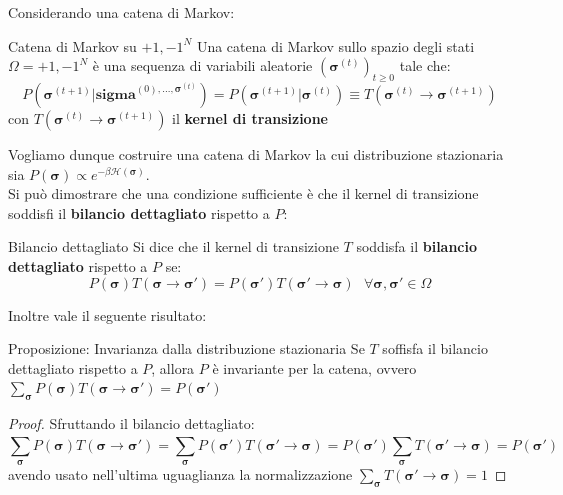 Considerando una catena di Markov:
\begin{boxb}{Catena di Markov su ${+1,-1}^N$}
Una catena di Markov sullo spazio degli stati $\Omega={+1,-1}^N$ è una sequenza di variabili aleatorie $(\mathbf{\sigma}^{(t)})_{t \ge 0}$ tale che:
\begin{equation}
    P(\mathbf{\sigma}^{(t+1)}| \mathbf{sigma}^{(0),..., \mathbf{\sigma}^{(t)}})=P(\mathbf{\sigma}^{(t+1)}| \mathbf{\sigma}^{(t)})\equiv T(\mathbf{\sigma}^{(t)}\to \mathbf{\sigma}^{(t+1)})
\end{equation}
con $T(\mathbf{\sigma}^{(t)}\to \mathbf{\sigma}^{(t+1)})$ il \textbf{kernel di transizione}
\end{boxb}
Vogliamo dunque costruire una catena di Markov la cui distribuzione stazionaria sia $P(\mathbf{\sigma}) \propto e^{-\beta \mathcal{H(\mathbf{\sigma})}}$. \\
Si può dimostrare che una condizione sufficiente è che il kernel di transizione soddisfi il \textbf{bilancio dettagliato} rispetto a $P$:
\begin{boxb}{Bilancio dettagliato}
Si dice che il kernel di transizione $T$ soddisfa il \textbf{bilancio dettagliato} rispetto a $P$ se:
\begin{equation}
    P(\mathbf{\sigma})T(\mathbf{\sigma}\to \mathbf{\sigma}')=P(\mathbf{\sigma}')T(\mathbf{\sigma}'\to \mathbf{\sigma}) \ \ \ \forall \mathbf{\sigma},\mathbf{\sigma}' \in \Omega
\end{equation}
\end{boxb}
Inoltre vale il seguente risultato:
\begin{boxl}{Proposizione: Invarianza dalla distribuzione stazionaria}
Se $T$ soffisfa il bilancio dettagliato rispetto a $P$, allora $P$ è invariante per la catena, ovvero $\sum_{\mathbf{\sigma}}^{}P(\mathbf{\sigma})T(\mathbf{\sigma}\to \mathbf{\sigma}')=P(\mathbf{\sigma}')$
\end{boxl}
\begin{proof}
Sfruttando il bilancio dettagliato:
\begin{equation}
    \sum_{\mathbf{\sigma}}^{}P(\mathbf{\sigma})T(\mathbf{\sigma}\to \mathbf{\sigma}')=\sum_{\mathbf{\sigma}}^{}P(\mathbf{\sigma}')T(\mathbf{\sigma}'\to \mathbf{\sigma})=P(\mathbf{\sigma}')\sum_{\mathbf{\sigma}}^{}T(\mathbf{\sigma}' \to \mathbf{\sigma})=P(\mathbf{\sigma}')
\end{equation}
avendo usato nell'ultima uguaglianza la normalizzazione $\sum_{\mathbf{\sigma}}^{}T(\mathbf{\sigma}' \to \mathbf{\sigma})=1$
\end{proof}
